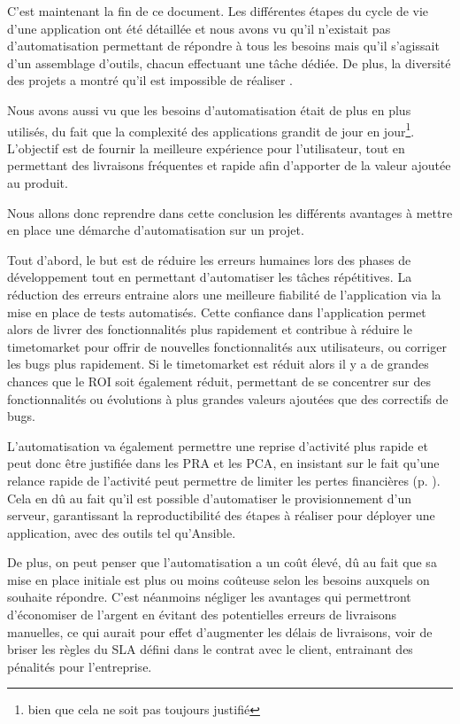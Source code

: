 C'est maintenant la fin de ce document. Les différentes étapes du cycle de vie d'une application ont été détaillée et nous avons vu qu'il n'existait pas d'automatisation  permettant de répondre à tous les besoins mais qu'il s'agissait d'un assemblage d'outils, chacun effectuant une tâche dédiée. De plus, la diversité des projets a montré qu'il est impossible de réaliser .

Nous avons aussi vu que les besoins d'automatisation était de plus en plus utilisés, du fait que la complexité des applications grandit de jour en jour\footnote{bien que cela ne soit pas toujours justifié}. L'objectif est de fournir la meilleure expérience pour l'utilisateur, tout en permettant des livraisons fréquentes et rapide afin d'apporter de la valeur ajoutée au produit.

Nous allons donc reprendre dans cette conclusion les différents avantages à mettre en place une démarche d'automatisation sur un projet.

Tout d'abord, le but est de réduire les erreurs humaines lors des phases de développement tout en permettant d'automatiser les tâches répétitives. La réduction des erreurs entraine alors une meilleure fiabilité de l'application via la mise en place de tests automatisés. Cette confiance dans l'application permet alors de livrer des fonctionnalités plus rapidement et contribue à réduire le \gls{timetomarket} pour offrir de nouvelles fonctionnalités aux utilisateurs, ou corriger les bugs plus rapidement. Si le \gls{timetomarket} est réduit alors il y a de grandes chances que le \gls{ROI} soit également réduit, permettant de se concentrer sur des fonctionnalités ou évolutions à plus grandes valeurs ajoutées que des correctifs de bugs.

L'automatisation va également permettre une reprise d'activité plus rapide et peut donc être justifiée dans les \gls{PRA} et les \gls{PCA}, en insistant sur le fait qu'une relance rapide de l'activité peut permettre de limiter les pertes financières (p. \pageref{ref-pra}). Cela en dû au fait qu'il est possible d'automatiser le provisionnement d'un serveur, garantissant la reproductibilité des étapes à réaliser pour déployer une application, avec des outils tel qu'Ansible.

De plus, on peut penser que l'automatisation a un coût élevé, dû au fait que sa mise en place initiale est plus ou moins coûteuse selon les besoins auxquels on souhaite répondre. C'est néanmoins négliger les avantages qui permettront d'économiser de l'argent en évitant des potentielles erreurs de livraisons manuelles, ce qui aurait pour effet d'augmenter les délais de livraisons, voir de briser les règles du \gls{SLA} défini dans le contrat avec le client, entrainant des pénalités pour l'entreprise.

